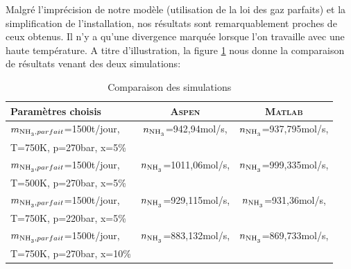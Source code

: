 \documentclass[a4paper, oneside, 12pt]{article}
\begin{document}
Malgré l'imprécision de notre modèle (utilisation
de la loi des gaz parfaits) et la simplification
de l'installation, nos résultats sont 
remarquablement proches de ceux obtenus. Il n'y
a qu'une divergence marquée lorsque l'on travaille 
avec une haute température. A titre d'illustration, 
la figure \ref{tab:sim} nous donne la comparaison 
de résultats venant des deux simulations:

\begin{table}[h!]
	\centering
	\begin{tabular}{l|c|c}
		Paramètres choisis & \textsc{Aspen} & \textsc{Matlab}\\
		\hline
		$m_{\ce{NH3}, parfait}$=1500t/jour, & $n_{\ce{NH3}}$=942,94mol/s, & $n_{\ce{NH3}}$=937,795mol/s,\\
		T=750K, p=270bar, x=5\%             &   &  \\
		\hline
		$m_{\ce{NH3}, parfait}$=1500t/jour, & $n_{\ce{NH3}}$=1011,06mol/s, & $n_{\ce{NH3}}$=999,335mol/s,\\
		T=500K, p=270bar, x=5\%             &   &  \\
		\hline
		$m_{\ce{NH3}, parfait}$=1500t/jour, & $n_{\ce{NH3}}$=929,115mol/s, & $n_{\ce{NH3}}$=931,36mol/s,\\
		T=750K, p=220bar, x=5\%             &   &  \\
		\hline
		$m_{\ce{NH3}, parfait}$=1500t/jour, & $n_{\ce{NH3}}$=883,132mol/s, & $n_{\ce{NH3}}$=869,733mol/s,\\
		T=750K, p=270bar, x=10\%             &   &  \\
		\hline

	\end{tabular}
	\caption{Comparaison des simulations}
	\label{tab:sim}
\end{table}

\appendix


\printbibliography
\end{document}
